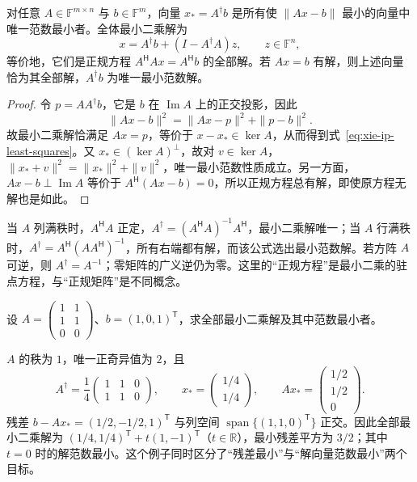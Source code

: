 \begin{theorem}
\label{thm:xie-ip-least-squares}
对任意 $A\in\mathbb F^{m\times n}$ 与 $b\in\mathbb F^m$，向量 $x_*=A^\dagger b$ 是所有使 $\|Ax-b\|$ 最小的向量中唯一范数最小者。全体最小二乘解为
\begin{equation}
\label{eq:xie-ip-least-squares}
x=A^\dagger b+(I-A^\dagger A)z,\qquad z\in\mathbb F^n,
\end{equation}
等价地，它们是正规方程 $A^{\mathsf H}Ax=A^{\mathsf H}b$ 的全部解。若 $Ax=b$ 有解，则上述向量恰为其全部解，$A^\dagger b$ 为唯一最小范数解。
\end{theorem}
\begin{proof}
令 $p=AA^\dagger b$，它是 $b$ 在 $\operatorname{Im}A$ 上的正交投影，因此
\[
\|Ax-b\|^2=\|Ax-p\|^2+\|p-b\|^2.
\]
故最小二乘解恰满足 $Ax=p$，等价于 $x-x_*\in\ker A$，从而得到式~\eqref{eq:xie-ip-least-squares}。又 $x_*\in(\ker A)^\perp$，故对 $v\in\ker A$，$\|x_*+v\|^2=\|x_*\|^2+\|v\|^2$，唯一最小范数性质成立。另一方面，$Ax-b\perp\operatorname{Im}A$ 等价于 $A^{\mathsf H}(Ax-b)=0$，所以正规方程总有解，即使原方程无解也是如此。
\end{proof}

当 $A$ 列满秩时，$A^{\mathsf H}A$ 正定，$A^\dagger=(A^{\mathsf H}A)^{-1}A^{\mathsf H}$，最小二乘解唯一；当 $A$ 行满秩时，$A^\dagger=A^{\mathsf H}(AA^{\mathsf H})^{-1}$，所有右端都有解，而该公式选出最小范数解。若方阵 $A$ 可逆，则 $A^\dagger=A^{-1}$；零矩阵的广义逆仍为零。这里的“正规方程”是最小二乘的驻点方程，与“正规矩阵”是不同概念。

\begin{example}
设 $A=\begin{pmatrix}1&1\\1&1\\0&0\end{pmatrix}$、$b=(1,0,1)^{\mathsf T}$，求全部最小二乘解及其中范数最小者。
\end{example}
\begin{solve}
$A$ 的秩为 $1$，唯一正奇异值为 $2$，且
\[
A^\dagger=\frac14\begin{pmatrix}1&1&0\\1&1&0\end{pmatrix},
\qquad x_*=\begin{pmatrix}1/4\\1/4\end{pmatrix},
\qquad Ax_*=\begin{pmatrix}1/2\\1/2\\0\end{pmatrix}.
\]
残差 $b-Ax_*=(1/2,-1/2,1)^{\mathsf T}$ 与列空间 $\operatorname{span}\{(1,1,0)^{\mathsf T}\}$ 正交。因此全部最小二乘解为 $(1/4,1/4)^{\mathsf T}+t(1,-1)^{\mathsf T}$（$t\in\mathbb R$），最小残差平方为 $3/2$；其中 $t=0$ 时的解范数最小。这个例子同时区分了“残差最小”与“解向量范数最小”两个目标。
\end{solve}

